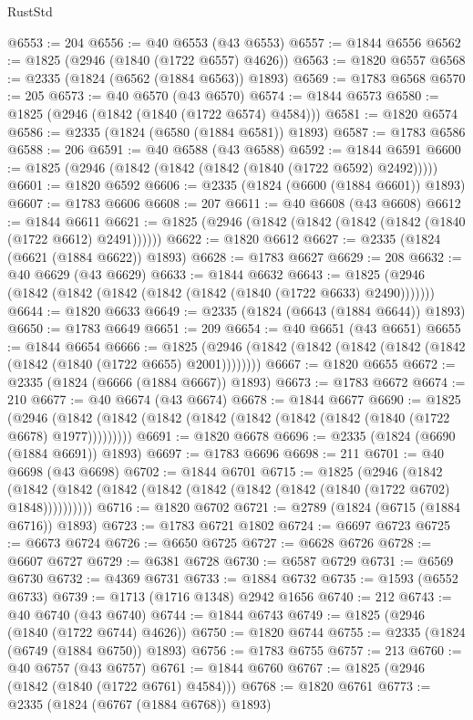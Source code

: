 \begin{lexlean}{RustStd}
\begin{coremodule}
@6553 := 204
@6556 := @40 @6553 (@43 @6553)
@6557 := @1844 @6556
@6562 := @1825 (@2946 (@1840 (@1722 @6557) @4626))
@6563 := @1820 @6557
@6568 := @2335 (@1824 (@6562 (@1884 @6563)) @1893)
@6569 := @1783 @6568
@6570 := 205
@6573 := @40 @6570 (@43 @6570)
@6574 := @1844 @6573
@6580 := @1825 (@2946 (@1842 (@1840 (@1722 @6574) @4584)))
@6581 := @1820 @6574
@6586 := @2335 (@1824 (@6580 (@1884 @6581)) @1893)
@6587 := @1783 @6586
@6588 := 206
@6591 := @40 @6588 (@43 @6588)
@6592 := @1844 @6591
@6600 := @1825 (@2946 (@1842 (@1842 (@1842 (@1840 (@1722 @6592) @2492)))))
@6601 := @1820 @6592
@6606 := @2335 (@1824 (@6600 (@1884 @6601)) @1893)
@6607 := @1783 @6606
@6608 := 207
@6611 := @40 @6608 (@43 @6608)
@6612 := @1844 @6611
@6621 := @1825 (@2946 (@1842 (@1842 (@1842 (@1842 (@1840 (@1722 @6612) @2491))))))
@6622 := @1820 @6612
@6627 := @2335 (@1824 (@6621 (@1884 @6622)) @1893)
@6628 := @1783 @6627
@6629 := 208
@6632 := @40 @6629 (@43 @6629)
@6633 := @1844 @6632
@6643 := @1825 (@2946 (@1842 (@1842 (@1842 (@1842 (@1842 (@1840 (@1722 @6633) @2490)))))))
@6644 := @1820 @6633
@6649 := @2335 (@1824 (@6643 (@1884 @6644)) @1893)
@6650 := @1783 @6649
@6651 := 209
@6654 := @40 @6651 (@43 @6651)
@6655 := @1844 @6654
@6666 := @1825 (@2946 (@1842 (@1842 (@1842 (@1842 (@1842 (@1842 (@1840 (@1722 @6655) @2001))))))))
@6667 := @1820 @6655
@6672 := @2335 (@1824 (@6666 (@1884 @6667)) @1893)
@6673 := @1783 @6672
@6674 := 210
@6677 := @40 @6674 (@43 @6674)
@6678 := @1844 @6677
@6690 := @1825
    (@2946 (@1842 (@1842 (@1842 (@1842 (@1842 (@1842 (@1842 (@1840 (@1722 @6678) @1977)))))))))
@6691 := @1820 @6678
@6696 := @2335 (@1824 (@6690 (@1884 @6691)) @1893)
@6697 := @1783 @6696
@6698 := 211
@6701 := @40 @6698 (@43 @6698)
@6702 := @1844 @6701
@6715 := @1825
    (@2946
      (@1842 (@1842 (@1842 (@1842 (@1842 (@1842 (@1842 (@1842 (@1840 (@1722 @6702) @1848))))))))))
@6716 := @1820 @6702
@6721 := @2789 (@1824 (@6715 (@1884 @6716)) @1893)
@6723 := @1783 @6721 @1802
@6724 := @6697 @6723
@6725 := @6673 @6724
@6726 := @6650 @6725
@6727 := @6628 @6726
@6728 := @6607 @6727
@6729 := @6381 @6728
@6730 := @6587 @6729
@6731 := @6569 @6730
@6732 := @4369 @6731
@6733 := @1884 @6732
@6735 := @1593 (@6552 @6733)
@6739 := @1713 (@1716 @1348) @2942 @1656
@6740 := 212
@6743 := @40 @6740 (@43 @6740)
@6744 := @1844 @6743
@6749 := @1825 (@2946 (@1840 (@1722 @6744) @4626))
@6750 := @1820 @6744
@6755 := @2335 (@1824 (@6749 (@1884 @6750)) @1893)
@6756 := @1783 @6755
@6757 := 213
@6760 := @40 @6757 (@43 @6757)
@6761 := @1844 @6760
@6767 := @1825 (@2946 (@1842 (@1840 (@1722 @6761) @4584)))
@6768 := @1820 @6761
@6773 := @2335 (@1824 (@6767 (@1884 @6768)) @1893)

\end{coremodule}
\end{lexlean}
